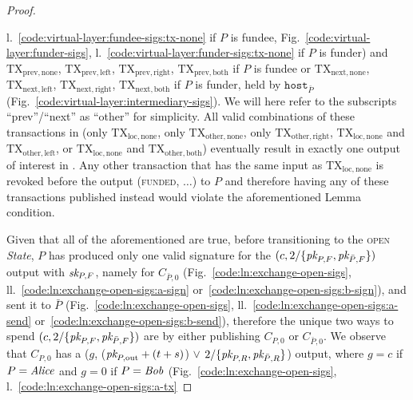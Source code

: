 \begin{proof}
\begin{itemize}
    l.~\ref{code:virtual-layer:fundee-sigs:tx-none} if $P$ is fundee,
    Fig.~\ref{code:virtual-layer:funder-sigs},
    l.~\ref{code:virtual-layer:funder-sigs:tx-none} if $P$ is funder) and
    $\mathrm{TX}_{\mathrm{prev}, \mathrm{none}}$, $\mathrm{TX}_{\mathrm{prev},
    \mathrm{left}}$, $\mathrm{TX}_{\mathrm{prev}, \mathrm{right}}$,
    $\mathrm{TX}_{\mathrm{prev}, \mathrm{both}}$ if $P$ is fundee or
    $\mathrm{TX}_{\mathrm{next}, \mathrm{none}}$, $\mathrm{TX}_{\mathrm{next},
    \mathrm{left}}$, $\mathrm{TX}_{\mathrm{next}, \mathrm{right}}$,
    $\mathrm{TX}_{\mathrm{next}, \mathrm{both}}$ if $P$ is funder, held by
    $\texttt{host}_{\bar{P}}$ (Fig.~\ref{code:virtual-layer:intermediary-sigs}).
    We will here refer to the subscripts ``prev''/``next'' as ``other'' for
    simplicity.  All valid combinations of these transactions in \ledger (only
    $\mathrm{TX}_{\mathrm{loc}, \mathrm{none}}$, only
    $\mathrm{TX}_{\mathrm{other}, \mathrm{none}}$, only
    $\mathrm{TX}_{\mathrm{other}, \mathrm{right}}$, $\mathrm{TX}_{\mathrm{loc},
    \mathrm{none}}$ and $\mathrm{TX}_{\mathrm{other}, \mathrm{left}}$, or
    $\mathrm{TX}_{\mathrm{loc}, \mathrm{none}}$ and
    $\mathrm{TX}_{\mathrm{other}, \mathrm{both}}$) eventually result in exactly
    one output of interest in \ledger. Any other transaction that has the same
    input as $\mathrm{TX}_{\mathrm{loc}, \mathrm{none}}$ is revoked before the
    output (\textsc{funded}, $\dots$) to $P$ and therefore having any of these
    transactions published instead would violate the aforementioned Lemma
    condition.
  \end{itemize}
  Given that all of the aforementioned are true, before transitioning to the
  \textsc{open} \textit{State}, $P$ has produced only one valid signature for
  the $(c, 2/\{\textit{pk}_{P, F}, \textit{pk}_{\bar{P}, F}\})$ output with $\textit{sk}_{P, F}$, namely
  for $C_{\bar{P}, 0}$ (Fig.~\ref{code:ln:exchange-open-sigs},
  ll.~\ref{code:ln:exchange-open-sigs:a-sign}
  or~\ref{code:ln:exchange-open-sigs:b-sign}), and sent it to $\bar{P}$
  (Fig.~\ref{code:ln:exchange-open-sigs},
  ll.~\ref{code:ln:exchange-open-sigs:a-send}
  or~\ref{code:ln:exchange-open-sigs:b-send}), therefore the unique two ways to
  spend $(c, 2/\{\textit{pk}_{P, F}, \textit{pk}_{\bar{P}, F}\})$ are by either publishing $C_{P,
  0}$ or $C_{\bar{P}, 0}$. We observe that $C_{P, 0}$ has a ($g$, ($\textit{pk}_{P,
  \mathrm{out}} + (t + s)$) $\vee$ $2/\{\textit{pk}_{P, R}, \textit{pk}_{\bar{P}, R}\}$) output,
  where $g = c$ if $P = \mathit{Alice}$ and $g = 0$ if $P = \mathit{Bob}$
  (Fig.~\ref{code:ln:exchange-open-sigs},
  l.~\ref{code:ln:exchange-open-sigs:a-tx}

\end{proof}
